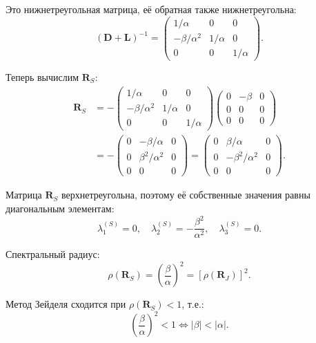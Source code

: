 \documentclass{article}
\begin{document}
Это нижнетреугольная матрица, её обратная также нижнетреугольна:
\begin{equation}
(\mathbf{D} + \mathbf{L})^{-1} = \begin{pmatrix} 1/\alpha & 0 & 0 \\ -\beta/\alpha^2 & 1/\alpha & 0 \\ 0 & 0 & 1/\alpha \end{pmatrix}.
\end{equation}

Теперь вычислим $\mathbf{R}_S$:
\begin{align}
\mathbf{R}_S &= -\begin{pmatrix} 1/\alpha & 0 & 0 \\ -\beta/\alpha^2 & 1/\alpha & 0 \\ 0 & 0 & 1/\alpha \end{pmatrix} \begin{pmatrix} 0 & -\beta & 0 \\ 0 & 0 & 0 \\ 0 & 0 & 0 \end{pmatrix} \nonumber \\
&= -\begin{pmatrix} 0 & -\beta/\alpha & 0 \\ 0 & \beta^2/\alpha^2 & 0 \\ 0 & 0 & 0 \end{pmatrix} = \begin{pmatrix} 0 & \beta/\alpha & 0 \\ 0 & -\beta^2/\alpha^2 & 0 \\ 0 & 0 & 0 \end{pmatrix}.
\end{align}

Матрица $\mathbf{R}_S$ верхнетреугольна, поэтому её собственные значения равны диагональным элементам:
\begin{equation}
\lambda_1^{(S)} = 0, \quad \lambda_2^{(S)} = -\frac{\beta^2}{\alpha^2}, \quad \lambda_3^{(S)} = 0.
\end{equation}

Спектральный радиус:
\begin{equation}
\rho(\mathbf{R}_S) = \left(\frac{\beta}{\alpha}\right)^2 = \left[\rho(\mathbf{R}_J)\right]^2.
\end{equation}

Метод Зейделя сходится при $\rho(\mathbf{R}_S) < 1$, т.е.:
\begin{equation}
\left(\frac{\beta}{\alpha}\right)^2 < 1 \iff \boxed{|\beta| < |\alpha|.}
\end{equation}
\end{document}
